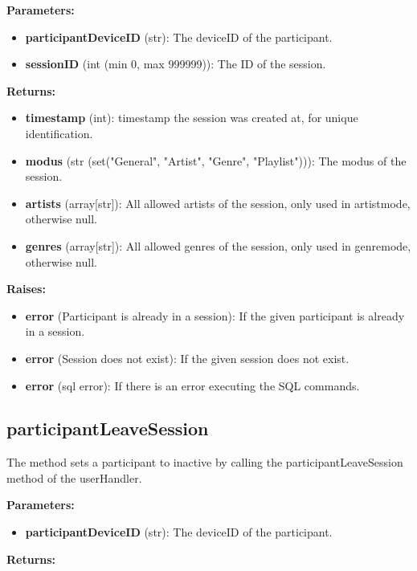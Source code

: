\documentclass[oneside, nenglish]{sdqtechreport}
\begin{document}
\begin{itemize}
\textbf{Parameters:}

\begin{itemize}
    \item \textbf{participantDeviceID} (str): The deviceID of the participant.
    \item \textbf{sessionID} (int (min 0, max 999999)): The ID of the session.
\end{itemize}

\textbf{Returns:}

\begin{itemize}
    \item \textbf{timestamp} (int): timestamp the session was created at, for unique identification.
    \item \textbf{modus} (str (set("General", "Artist", "Genre", "Playlist"))): The modus of the session.
    \item \textbf{artists} (array[str]): All allowed artists of the session, only used in artistmode, otherwise null.
    \item \textbf{genres} (array[str]): All allowed genres of the session, only used in genremode, otherwise null.
\end{itemize}

\textbf{Raises:}

\begin{itemize}
    \item \textbf{error} (Participant is already in a session): If the given participant is already in a session.
    \item \textbf{error} (Session does not exist): If the given session does not exist.
    \item \textbf{error} (sql error): If there is an error executing the SQL commands.
\end{itemize}


\subsection{participantLeaveSession}

The method sets a participant to inactive by calling the participantLeaveSession method of the userHandler.

\textbf{Parameters:}

\begin{itemize}
    \item \textbf{participantDeviceID} (str): The deviceID of the participant.
\end{itemize}

\textbf{Returns:}


\end{itemize}
\end{document}
